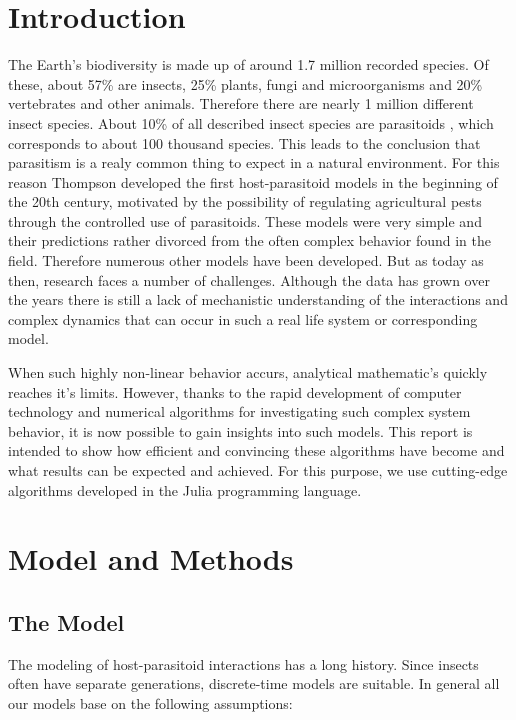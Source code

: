 \documentclass[a4paper,12pt, twoside]{article} %
\begin{document}
\section{Introduction}
The Earth's biodiversity is made up of around 1.7 million recorded species. Of these, about 57\% are insects, 25\% plants, 
fungi and microorganisms and 20\% vertebrates and other animals. Therefore there are nearly 1 million different insect species. \autocite[S. 35ff]{biodiversity}
About 10\% of all described insect species are parasitoids \autocite{eggleton1997}, 
which corresponds to about 100 thousand species. This leads to the conclusion that parasitism is a realy common thing to expect in a natural
environment. For this reason Thompson developed the first host-parasitoid models in the beginning of the 20th century, motivated by the possibility 
of regulating agricultural pests through the controlled use of parasitoids. These models were very simple and their predictions rather divorced
from the often complex behavior found in the field. Therefore numerous other models have been developed. But as today as then, research faces a number 
of challenges. Although the data has grown over the years there is still a lack of mechanistic understanding of the interactions 
and complex dynamics that can occur in such a real life system or corresponding model. 
 
When such highly non-linear behavior accurs, analytical mathematic's quickly reaches it's limits. 
However, thanks to the rapid development of computer technology and numerical algorithms for investigating such complex system behavior, it is now 
possible to gain insights into such models. This report is intended to show how efficient and convincing these algorithms have become 
and what results can be expected and achieved. For this purpose, we use cutting-edge algorithms developed in the Julia programming language.


\section{Model and Methods}

\subsection{The Model}
The modeling of host-parasitoid interactions has a long history. Since insects often have separate generations, 
discrete-time models are suitable. In general all our models base on the following assumptions:
\end{document}
